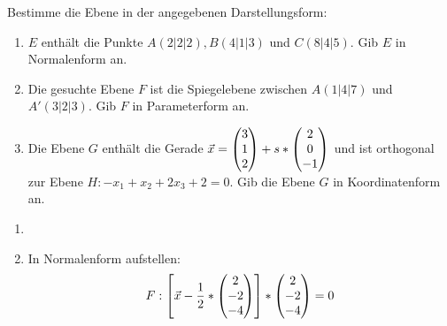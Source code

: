 Bestimme die Ebene in der angegebenen Darstellungsform:
\begin{enumerate}
	\item $E$ enthält die Punkte $A(2|2|2), B(4|1|3)$ und $C(8|4|5)$. Gib $E$ in Normalenform an. %
	\item Die gesuchte Ebene $F$ ist die Spiegelebene zwischen $A(1|4|7)$ und $A'(3|2|3)$. Gib $F$ in Parameterform an. %
	\item Die Ebene $G$ enthält die Gerade $\vec x = \begin{pmatrix} 3\\1\\2 \end{pmatrix}+s*\begin{pmatrix} 2\\0\\-1 \end{pmatrix}$ und ist orthogonal zur Ebene $H:-x_1+x_2+2x_3+2=0$. Gib die Ebene $G$ in Koordinatenform an. %
\end{enumerate}
\begin{lsg}{}
	\begin{enumerate}
		\item
		\item In Normalenform aufstellen:
		\begin{equation*}
			F: \left[\vec x - \frac 12 *\begin{pmatrix} 2\\-2\\-4 \end{pmatrix}\right]*\begin{pmatrix} 2\\-2\\-4 \end{pmatrix}=0
		\end{equation*}
	\end{enumerate}
\end{lsg}




